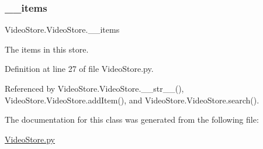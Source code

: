 \subsubsection{\texorpdfstring{\+\_\+\+\_\+items}{\_\_items}}
{\footnotesize\ttfamily Video\+Store.\+Video\+Store.\+\_\+\+\_\+items\hspace{0.3cm}{\ttfamily [private]}}



The items in this store. 



Definition at line 27 of file Video\+Store.\+py.



Referenced by Video\+Store.\+Video\+Store.\+\_\+\+\_\+str\+\_\+\+\_\+(), Video\+Store.\+Video\+Store.\+add\+Item(), and Video\+Store.\+Video\+Store.\+search().



The documentation for this class was generated from the following file\+:\begin{DoxyCompactItemize}
\item 
\hyperlink{VideoStore_8py}{Video\+Store.\+py}\end{DoxyCompactItemize}
